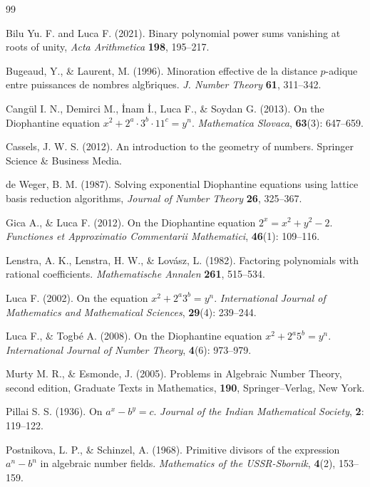 \documentclass[11pt,a4paper]{article}
\numberwithin{equation}{section}
\numberwithin{table}{section}
\numberwithin{figure}{section}
\begin{document}
{\begin{thebibliography}{99}
	
	Bilu Yu. F. and Luca F. (2021). Binary polynomial power sums vanishing at roots of unity, \textit{Acta Arithmetica} {\bf 198}, 195--217.
			
	Bugeaud, Y., \& Laurent, M. (1996). Minoration effective de la distance $p$-adique entre puissances de nombres alg\'briques. {\it J. Number Theory\/} {\bf 61}, 311--342.
				
	Cang\"{u}l I. N., Demirci M., \.{I}nam \.{I}., Luca F., \& Soydan G. (2013).
	On the Diophantine equation $x^2 + 2^a \cdot 3^b \cdot 11^c = y^n$.
	\textit{Mathematica Slovaca}, {\bf 63}(3): 647--659.
	
	Cassels, J. W. S. (2012). An introduction to the geometry of numbers. Springer Science \& Business Media.
	
	de Weger, B. M. (1987). Solving exponential Diophantine equations using lattice basis reduction algorithms, {\it Journal of Number Theory\/} {\bf 26},  325--367.
	
	Gica A., \& Luca F. (2012).
	On the Diophantine equation $2^x = x^2 + y^2 - 2$.
	\textit{Functiones et Approximatio Commentarii Mathematici}, {\bf 46}(1): 109--116.
	
	Lenstra, A. K., Lenstra, H. W., \& Lov\'asz, L. (1982). Factoring polynomials with rational coefficients. {\it Mathematische Annalen\/} {\bf 261}, 515--534.
	
	Luca F. (2002).
	On the equation $x^2 + 2^a 3^b = y^n$.
	\textit{International Journal of Mathematics and Mathematical Sciences},	{\bf 29}(4): 239--244.
	
	
	Luca F., \& Togb\'e A. (2008).
	On the Diophantine equation $x^2 + 2^a 5^b = y^n$.
	\textit{International Journal of Number Theory}, {\bf 4}(6): 973--979.
	
	Murty M. R., \& Esmonde, J. (2005). Problems in Algebraic Number Theory, second edition, Graduate Texts in Mathematics, {\bf 190}, Springer--Verlag, New York.
	
	Pillai S. S. (1936). On $a^x - b^y = c$. \textit{Journal of the Indian Mathematical Society}, {\bf 2}: 119--122.
	
	Postnikova, L. P., \& Schinzel, A. (1968). Primitive divisors of the expression $a^n-b^n$ in
	algebraic number fields. \textit{Mathematics of the USSR-Sbornik}, \textbf{4}(2), 153--159.
	

\end{thebibliography}}
\end{document}
